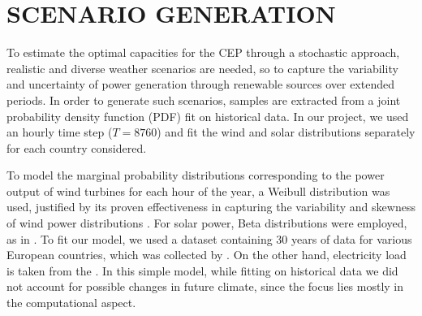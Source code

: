 \documentclass[smallextended,natbib]{svjour3}       %
\numberwithin{theorem}{section}
\begin{document}
















\newpage
\appendix

\section{SCENARIO GENERATION}\label{generation}

To estimate the optimal capacities for the CEP through a stochastic approach, realistic and diverse weather scenarios are needed, so to capture the variability and uncertainty of power generation through renewable sources over extended periods. 
In order to generate such scenarios, samples are extracted from a joint probability density function (PDF) fit on historical data. 
In our project, we used an hourly time step ($T=8760$) and fit the wind and solar distributions separately for each country considered.

To model the marginal probability distributions corresponding to the power output of wind turbines for each hour of the year, a Weibull distribution was used, justified by its proven effectiveness in capturing the variability and skewness of wind power distributions \citep{weibullwind}. 
For solar power, Beta distributions were employed, as in \citet{betaPV}.
To fit our model, we used a dataset containing 30 years of data for various European countries, which was collected by \citet{30y_gen}. 
On the other hand, electricity load is taken from the \citet{ENTSOE_PowerStats}.
In this simple model, while fitting on historical data we did not account for possible changes in future climate, since the focus lies mostly in the computational aspect.
\end{document}
